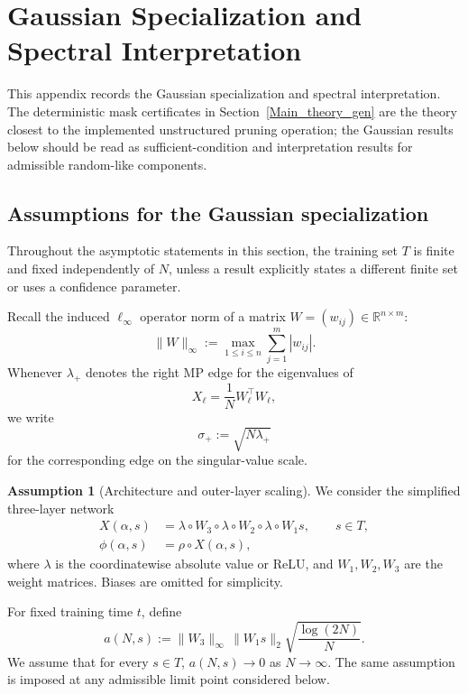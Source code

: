 \documentclass[11pt]{article}
\theoremstyle{plain}
\theoremstyle{definition}
\newtheorem{assumption}[thm]{Assumption}
\theoremstyle{remark}
\newcommand{\R}{\mathbb{R}}
\newcommand{\1}{\mathbf{1}}
\begin{document}
\section{Gaussian Specialization and Spectral Interpretation}
\label{Main_theory}

This appendix records the Gaussian specialization and spectral interpretation. The deterministic mask certificates in Section~\ref{Main_theory_gen} are the theory closest to the implemented unstructured pruning operation; the Gaussian results below should be read as sufficient-condition and interpretation results for admissible random-like components.

\subsection{Assumptions for the Gaussian specialization}
\label{assumptions}

Throughout the asymptotic statements in this section, the training set \(T\) is finite and fixed independently of \(N\), unless a result explicitly states a different finite set or uses a confidence parameter.

Recall the induced \(\ell_\infty\) operator norm of a matrix \(W=(w_{ij})\in\R^{n\times m}\):
\[
\|W\|_\infty:=\max_{1\le i\le n}\sum_{j=1}^m |w_{ij}|.
\]
Whenever \(\lambda_+\) denotes the right MP edge for the eigenvalues of
\[
X_\ell=\frac1N W_\ell^\top W_\ell,
\]
we write
\[
\sigma_+ := \sqrt{N\lambda_+}
\]
for the corresponding edge on the singular-value scale.

\begin{assumption}[Architecture and outer-layer scaling]
\label{as1}
We consider the simplified three-layer network
\begin{align}
X(\alpha,s) &= \lambda\circ W_3 \circ \lambda\circ W_2 \circ \lambda\circ W_1 s,\qquad s\in T,\\
\phi(\alpha,s) &= \rho\circ X(\alpha,s),
\end{align}
where \(\lambda\) is the coordinatewise absolute value or ReLU, and \(W_1,W_2,W_3\) are the weight matrices. Biases are omitted for simplicity.

For fixed training time \(t\), define
\begin{equation}
\label{eqans}
a(N,s):=\|W_3\|_{\infty}\,\|W_1s\|_2\sqrt{\frac{\log(2N)}{N}}.
\end{equation}
We assume that for every \(s\in T\), \(a(N,s)\to 0\) as \(N\to\infty\). The same assumption is imposed at any admissible limit point considered below.
\end{assumption}
\end{document}
